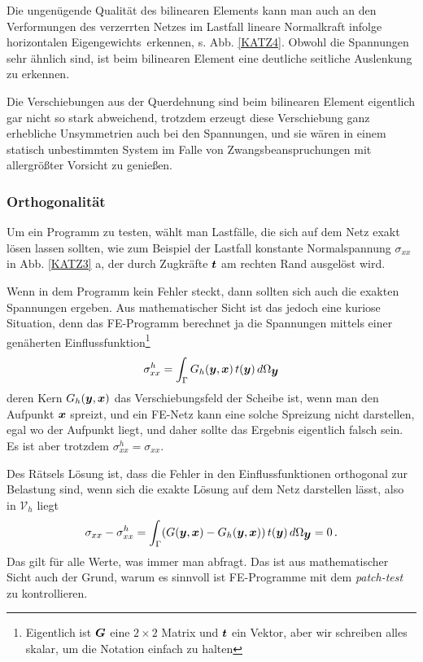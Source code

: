 {Die ungen\"{u}gende Qualit\"{a}t des bilinearen Elements kann man auch an den Verformungen des verzerrten Netzes im Lastfall \glq lineare Normalkraft infolge horizontalen Eigengewichts\grq\ erkennen, s. Abb. \ref{KATZ4}. Obwohl die Spannungen sehr \"{a}hnlich sind, ist beim bilinearen Element eine deutliche seitliche Auslenkung zu erkennen.

Die Verschiebungen aus der Querdehnung sind beim bilinearen Element eigentlich gar nicht so stark abweichend, trotzdem erzeugt diese Verschiebung ganz erhebliche Unsymmetrien auch bei den Spannungen, und sie w\"{a}ren in einem statisch unbestimmten System im Falle von Zwangsbeanspruchungen mit allergr\"{o}{\ss}ter Vorsicht zu genie{\ss}en.

{\textcolor{sectionTitleBlue}{\subsubsection*{Orthogonalit\"{a}t}}}

Um ein Programm zu testen, w\"{a}hlt man Lastf\"{a}lle, die sich auf dem Netz exakt l\"{o}sen lassen sollten, wie zum Beispiel der Lastfall konstante Normalspannung $\sigma_{xx}$ in Abb. \ref{KATZ3} a, der durch Zugkr\"{a}fte $\mbox{\boldmath $t$} $ am rechten Rand ausgel\"{o}st wird.

Wenn in dem Programm kein Fehler steckt, dann sollten sich auch die exakten Spannungen ergeben. Aus mathematischer Sicht ist das jedoch eine kuriose Situation, denn das FE-Programm berechnet ja die Spannungen mittels einer gen\"{a}herten Einflussfunktion\footnote{Eigentlich ist $\mbox{\boldmath $G$}$ eine $2 \times 2$ Matrix und $\mbox{\boldmath $t$}$ ein Vektor, aber wir schreiben alles skalar, um die Notation einfach zu halten}
\begin{align}
\sigma_{xx}^h = \int_{\Gamma} G_h(\mbox{\boldmath $y$}, \mbox{\boldmath $x$})\,t(\mbox{\boldmath $y$})\,d\Omega_{\mbox{\boldmath $y$}}
\end{align}
deren Kern $G_h(\mbox{\boldmath $y$}, \mbox{\boldmath $x$}) $ das Verschiebungsfeld der Scheibe ist, wenn man den Aufpunkt $\mbox{\boldmath $x$}$ spreizt, und ein FE-Netz kann eine solche Spreizung nicht darstellen, egal wo der Aufpunkt liegt, und daher sollte das Ergebnis eigentlich falsch sein. Es ist aber trotzdem $\sigma_{xx}^h = \sigma_{xx} $.

Des R\"{a}tsels L\"{o}sung ist, dass die Fehler in den Einflussfunktionen orthogonal zur Belastung sind, wenn sich die exakte L\"{o}sung auf dem Netz darstellen l\"{a}sst, also in $\mathcal{V}_h $ liegt
\begin{align}\label{Eq12}
\sigma_{xx} - \sigma_{xx}^h = \int_{\Gamma} (G(\mbox{\boldmath $y$}, \mbox{\boldmath $x$}) - G_h(\mbox{\boldmath $y$}, \mbox{\boldmath $x$}))\,t(\mbox{\boldmath $y$})\,d\Omega_{\mbox{\boldmath $y$}} = 0\,.
\end{align}
Das gilt f\"{u}r alle Werte, was immer man abfragt. Das ist aus mathematischer Sicht auch der Grund, warum es sinnvoll ist FE-Programme mit dem {\em patch-test\/} zu kontrollieren.

}

